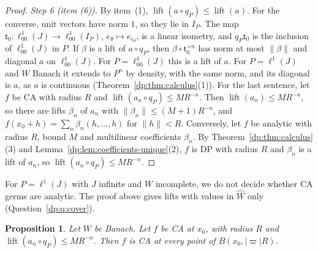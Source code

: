 \documentclass[11pt]{amsart}
\newtheorem{proposition}[theorem]{Proposition}
\theoremstyle{definition}
\theoremstyle{remark}
\numberwithin{equation}{section}
\newcommand{\abs}[1]{\lvert #1\rvert}
\newcommand{\norm}[1]{\lVert #1\rVert}
\theoremstyle{plain}
\theoremstyle{definition}
\theoremstyle{plain}
\begin{document}
\begin{proof}
\emph{Step 6 (item (6)).} By item~(1), $\operatorname{lift}(a\circ q_P)\le\operatorname{lift}(a)$. For the converse, unit vectors have norm $1$, so they lie in $I_P$. The map $\mathsf t_0\colon\ell^1_{00}(J)\to\ell^1_{00}(I_P)$, $e_\theta\mapsto e_{e_\theta}$, is a linear isometry, and $q_P\mathsf t_0$ is the inclusion of $\ell^1_{00}(J)$ in $P$. If $\beta$ is a lift of $a\circ q_P$, then $\beta\circ\mathsf t_0^{\times n}$ has norm at most $\norm\beta$ and diagonal $a$ on $\ell^1_{00}(J)$. For $P=\ell^1_{00}(J)$ this is a lift of $a$. For $P=\ell^1(J)$ and $W$ Banach it extends to $P^n$ by density, with the same norm, and its diagonal is $a$, as $a$ is continuous (Theorem~\ref{dp:thm:calculus}(1)). For the last sentence, let $f$ be CA with radius $R$ and $\operatorname{lift}(a_n\circ q_P)\le MR^{-n}$. Then $\operatorname{lift}(a_n)\le MR^{-n}$, so there are lifts $\beta_n$ of $a_n$ with $\norm{\beta_n}\le(M+1)R^{-n}$, and $f(x_0+h)=\sum_n\beta_n(h,\dots,h)$ for $\norm h<R$. Conversely, let $f$ be analytic with radius $R$, bound $M$ and multilinear coefficients $\beta_n$. By Theorem~\ref{dp:thm:calculus}(3) and Lemma~\ref{dp:lem:coefficients-unique}(2), $f$ is DP with radius $R$ and $\beta_n$ is a lift of $a_n$, so $\operatorname{lift}(a_n\circ q_P)\le MR^{-n}$.
\end{proof}

For $P=\ell^1(J)$ with $J$ infinite and $W$ incomplete, we do not decide whether CA germs are analytic. The proof above gives lifts with values in $\widehat W$ only (Question~\ref{dp:q:cover}).

\begin{proposition}\label{dp:prop:ca-open}
Let $W$ be Banach. Let $f$ be CA at $x_0$, with radius $R$ and $\operatorname{lift}(a_n\circ q_P)\le MR^{-n}$. Then $f$ is CA at every point of $B(x_0,\abs\varpi R)$.
\end{proposition}
\end{document}
